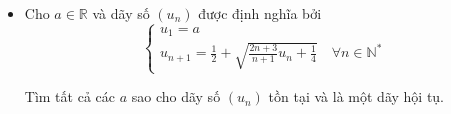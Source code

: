 \documentclass[11pt]{scrartcl}
\begin{document}
\begin{itemize}[label=, leftmargin=0em, itemsep=-0em]

    \item \begin{btvn}
    	Cho $a\in\mathbb{R}$ và dãy số $(u_n)$ được định nghĩa bởi
\[ \begin{cases} u_1=a\\ u_{n+1}=\frac{1}{2}+\sqrt{\frac{2n+3}{n+1}u_n+\frac{1}{4}}\quad\forall n\in\mathbb{N}^* \end{cases} \]

 Tìm tất cả các $a$ sao cho dãy số $(u_n)$ tồn tại và là một dãy hội tụ.
    \end{btvn}


\end{itemize}
\end{document}
